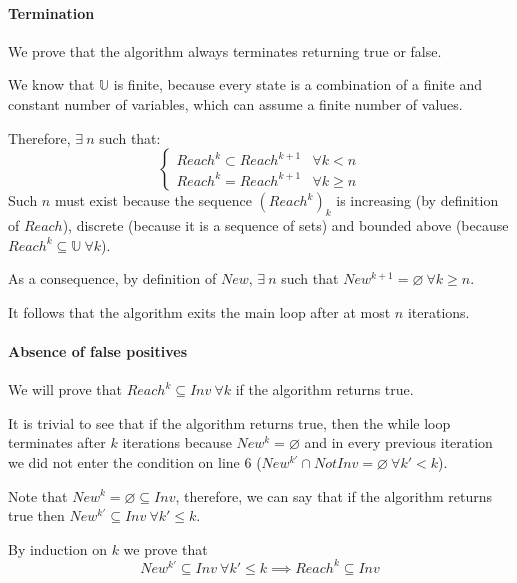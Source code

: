 \documentclass[12pt]{article}
\begin{document}
    \paragraph{Termination}
    We prove that the algorithm always terminates returning true or false.
   
    \noindent
    We know that $\mathbb U$ is finite, because every state is a combination of a finite and constant number of variables, which can assume a finite number of values.

    \noindent
    Therefore, $\exists\ n$ such that:
    $$
    \begin{cases}
          Reach^k \subset Reach^{k+1} & \forall k < n \\
          Reach^k = Reach^{k+1} & \forall k \geq n
    \end{cases}
    $$
    Such $n$ must exist because the sequence $(Reach^k)_k$ is increasing (by definition of $Reach$), discrete (because it is a sequence of sets) and bounded above (because $Reach^k \subseteq \mathbb U\ \forall k$).

    \noindent
    As a consequence, by definition of $New$, $\exists\ n$ such that $New^{k+1} = \varnothing\ \forall k \geq n$.

    \noindent
    It follows that the algorithm exits the main loop after at most $n$ iterations.

    \paragraph{Absence of false positives}
    We will prove that $Reach^k \subseteq Inv\ \forall k$ if the algorithm returns true.

    \noindent
    It is trivial to see that if the algorithm returns true, then the while loop terminates after $k$ iterations because $New^k = \varnothing$ and in every previous iteration we did not enter the condition on line 6 ($New^{k'} \cap NotInv = \varnothing\ \forall k' < k$).

    \noindent
    Note that $New^k = \varnothing \subseteq Inv$, therefore, we can say that if the algorithm returns true then $New^{k'} \subseteq Inv\ \forall k' \leq k$.

    \noindent
    By induction on $k$ we prove that
    \begin{equation}\label{th:true:tesi}
        New^{k'} \subseteq Inv\ \forall k' \leq k \implies Reach^k \subseteq Inv
    \end{equation}
    
\end{document}
